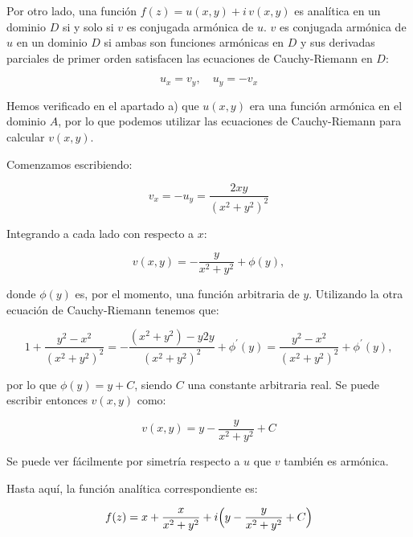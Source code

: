\begin{enumerate}
    Por otro lado, una función $f(z) = u(x,y) + i\,v(x,y)$ es analítica en un dominio $D$ si y solo si $v$ es conjugada
    armónica de $u$. $v$ es conjugada armónica de $u$ en un dominio $D$
    si ambas son funciones armónicas en $D$ y sus derivadas parciales de primer orden
    satisfacen las ecuaciones de Cauchy-Riemann en $D$:

    \begin{equation*}
        u_x = v_y,\hspace{12pt} u_y = -v_x
    \end{equation*}

    Hemos verificado en el apartado a) que $u(x,y)$ era una función armónica en el dominio $A$, por lo que podemos utilizar las ecuaciones de
    Cauchy-Riemann para calcular $v(x,y)$.

    Comenzamos escribiendo:

    \begin{equation*}
        v_x = -u_y = \frac{2xy}{(x^2+ y^2)^2}
    \end{equation*}

    Integrando a cada lado con respecto a $x$:

    \begin{equation*}
        v(x,y) = - \frac{y}{x^2 + y^2} + \phi(y),
    \end{equation*}

    donde $\phi(y)$ es, por el momento, una función arbitraria de $y$. Utilizando la otra ecuación de Cauchy-Riemann tenemos que:

    \begin{equation*}
        1 + \frac{y^2 - x^2}{(x^2+y^2)^2} = - \frac{(x^2+y^2)-y2y}{(x^2+y^2)^2} + \phi^{\prime}(y) = \frac{y^2 - x^2}{(x^2+y^2)^2} + \phi^{\prime}(y),
    \end{equation*}

    por lo que $\phi(y) = y + C$, siendo $C$ una constante arbitraria real. Se puede escribir entonces $v(x,y)$ como:

    \begin{equation*}
        v(x,y) = y - \frac{y}{x^2+y^2} + C
    \end{equation*}

    Se puede ver fácilmente por simetría respecto a $u$ que $v$ también es armónica.

    Hasta aquí, la función analítica correspondiente es:

    \begin{equation*}
        f(z) = x + \frac{x}{x^2+y^2} + i \Bigl(y - \frac{y}{x^2+y^2} + C\Bigr)
    \end{equation*}


\end{enumerate}

